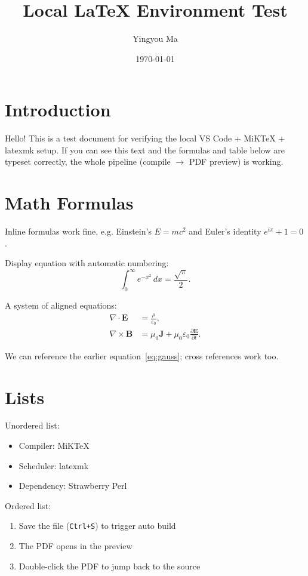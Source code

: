 \documentclass[11pt]{article}
\title{Local \LaTeX{} Environment Test}
\author{Yingyou Ma}
\date{\today}
\begin{document}
\maketitle

\section{Introduction}
Hello! This is a test document for verifying the local VS Code + MiKTeX + latexmk
setup. If you can see this text and the formulas and table below are typeset
correctly, the whole pipeline (compile $\to$ PDF preview) is working.

\section{Math Formulas}
Inline formulas work fine, e.g. Einstein's $E = mc^2$ and Euler's identity
$e^{i\pi} + 1 = 0$.

Display equation with automatic numbering:
\begin{equation}
    \int_0^\infty e^{-x^2}\, dx = \frac{\sqrt{\pi}}{2}.
    \label{eq:gauss}
\end{equation}

A system of aligned equations:
\begin{align}
    \nabla \cdot \mathbf{E} &= \frac{\rho}{\varepsilon_0}, \\
    \nabla \times \mathbf{B} &= \mu_0 \mathbf{J} + \mu_0 \varepsilon_0 \frac{\partial \mathbf{E}}{\partial t}.
\end{align}

We can reference the earlier equation~\eqref{eq:gauss}; cross references work too.

\section{Lists}
Unordered list:
\begin{itemize}
    \item Compiler: MiKTeX
    \item Scheduler: latexmk
    \item Dependency: Strawberry Perl
\end{itemize}

Ordered list:
\begin{enumerate}
    \item Save the file (\texttt{Ctrl+S}) to trigger auto build
    \item The PDF opens in the preview
    \item Double-click the PDF to jump back to the source
\end{enumerate}
\end{document}
